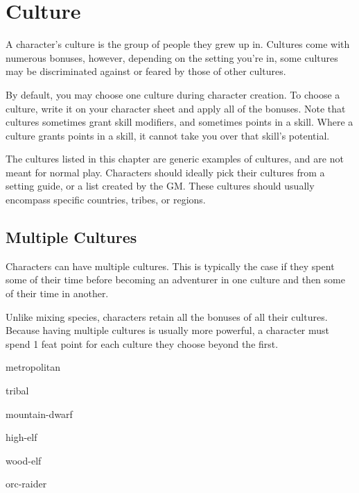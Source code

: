\chapter{Culture}\label{culture}

\begin{multicols*}{2}
    A character's culture is the group of people they grew up in. Cultures come
    with numerous bonuses, however, depending on the setting you're in, some
    cultures may be discriminated against or feared by those of other cultures.

    By default, you may choose one culture during character creation. To choose a
    culture, write it on your character sheet and apply all of the bonuses. Note
    that cultures sometimes grant skill modifiers, and sometimes points in a skill.
    Where a culture grants points in a skill, it cannot take you over that skill's
    potential.

    The cultures listed in this chapter are generic examples of cultures, and are
    not meant for normal play. Characters should ideally pick their cultures from
    a setting guide, or a list created by the GM. These cultures should usually
    encompass specific countries, tribes, or regions.

    \section{Multiple Cultures}
    Characters can have multiple cultures. This is typically the case if they spent
    some of their time before becoming an adventurer in one culture and then some
    of their time in another.

    Unlike mixing species, characters retain all the bonuses of all their cultures.
    Because having multiple cultures is usually more powerful, a character must
    spend 1 feat point for each culture they choose beyond the first.

    {metropolitan}

    {tribal}

    {mountain-dwarf}

    {high-elf}

    {wood-elf}

    {orc-raider}
\end{multicols*}
